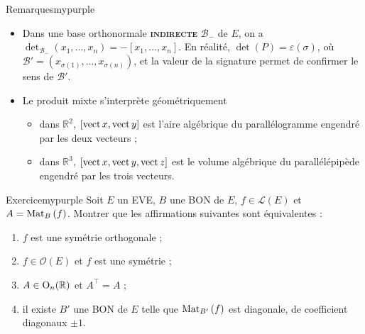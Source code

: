     \begin{omed}{Remarques}{mypurple}
        \begin{itemize}[label=\textcolor{mypurple}{$\star$}]
            \item Dans une base orthonormale \textbf{\textsc{indirecte}} $\mathcal{B}_-$ de $E$, on a $\det_{\mathcal{B}_-}(x_1,\ldots,x_n) = - [x_1,\ldots,x_n]$. En réalité, $\det(P) = \varepsilon(\sigma)$, où $\mathcal{B}' = (x_{\sigma(1)}, \ldots, x_{\sigma(n)})$, et la valeur de la signature permet de confirmer le sens de $\mathcal{B}'$.
            \item Le produit mixte s’interprète géométriquement 
            \begin{itemize}
                \item dans $\mathbb{R}^2$, $\left[\operatorname{vect}{x},\operatorname{vect}{y}\right]$ est l’aire algébrique du parallélogramme engendré par les deux vecteurs ;
                \item dans $\mathbb{R}^3$, $\left[\operatorname{vect}{x},\operatorname{vect}{y}, \operatorname{vect}{z}\right]$ est le volume algébrique du parallélépipède engendré par les trois vecteurs.
            \end{itemize}
        \end{itemize}
    \end{omed}

    \begin{omed}{Exercice}{mypurple}
        Soit $E$ un EVE, $B$ une BON de $E$, $f \in \mathcal{L}(E)$ et $A = \text{Mat}_{B}\left(f\right)$. Montrer que les affirmations suivantes sont équivalentes :
        \begin{enumerate}
            \item $f$ est une symétrie orthogonale ;
            \item $f \in \mathcal{O}(E)$ et $f$ est une symétrie ;
            \item $A \in \operatorname{O}_n(\mathbb{R})$ et $A^{\top} = A$ ;
            \item il existe $B'$ une BON de $E$ telle que $\text{Mat}_{B'}\left(f\right)$ est diagonale, de coefficient diagonaux $\pm 1$.
        \end{enumerate}
    \end{omed}

